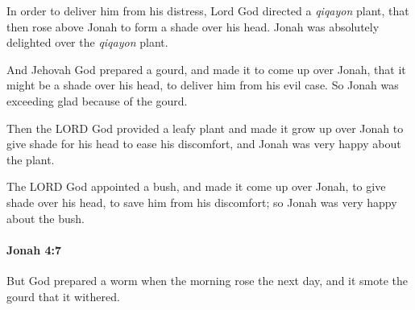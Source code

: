 			\begin{versebox}
					\item[BHS] 
					\item[LXX] 
					\item[AB 1990 270] In order to deliver him from his distress, Lord God directed a \textit{qiqayon} plant, that then rose above Jonah to form a shade over his head. Jonah was absolutely delighted over the \textit{qiqayon} plant.
					\item[ASV] And Jehovah God prepared a gourd, and made it to come up over Jonah, that it might be a shade over his head, to deliver him from his evil case. So Jonah was exceeding glad because of the gourd.
					\item[NIV] Then the LORD God provided a leafy plant and made it grow up over Jonah to give shade for his head to ease his discomfort, and Jonah was very happy about the plant.
					\item[NRSV] The LORD God appointed a bush, and made it come up over Jonah, to give shade over his head, to save him from his discomfort; so Jonah was very happy about the bush.
			\end{versebox}

		\paragraph{Jonah 4:7} %
			\label{JONAH-4-7}

			But God prepared a worm when the morning rose the next day, and it smote the gourd that it withered.


